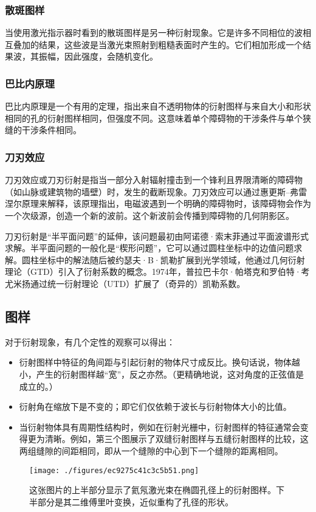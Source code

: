 \subsubsection{散斑图样}  
当使用激光指示器时看到的散斑图样是另一种衍射现象。它是许多不同相位的波相互叠加的结果，这些波是当激光束照射到粗糙表面时产生的。它们相加形成一个结果波，其振幅，因此强度，会随机变化。
\subsubsection{巴比内原理}   
巴比内原理是一个有用的定理，指出来自不透明物体的衍射图样与来自大小和形状相同的孔的衍射图样相同，但强度不同。这意味着单个障碍物的干涉条件与单个狭缝的干涉条件相同。
\subsubsection{刀刃效应} 
刀刃效应或刀刃衍射是指当一部分入射辐射撞击到一个锋利且界限清晰的障碍物（如山脉或建筑物的墙壁）时，发生的截断现象。刀刃效应可以通过惠更斯–弗雷涅尔原理来解释，该原理指出，电磁波遇到一个明确的障碍物时，该障碍物会作为一个次级源，创造一个新的波前。这个新波前会传播到障碍物的几何阴影区。

刀刃衍射是“半平面问题”的延伸，该问题最初由阿诺德·索末菲通过平面波谱形式求解。半平面问题的一般化是“楔形问题”，它可以通过圆柱坐标中的边值问题求解。圆柱坐标中的解法随后被约瑟夫·B·凯勒扩展到光学领域，他通过几何衍射理论（GTD）引入了衍射系数的概念。1974年，普拉巴卡尔·帕塔克和罗伯特·考尤米扬通过统一衍射理论（UTD）扩展了（奇异的）凯勒系数。
\subsection{图样}
对于衍射现象，有几个定性的观察可以得出：
\begin{itemize}
\item 衍射图样中特征的角间距与引起衍射的物体尺寸成反比。换句话说，物体越小，产生的衍射图样越“宽”，反之亦然。（更精确地说，这对角度的正弦值是成立的。）
\item 衍射角在缩放下是不变的；即它们仅依赖于波长与衍射物体大小的比值。
\item 当衍射物体具有周期性结构时，例如在衍射光栅中，衍射图样的特征通常会变得更为清晰。例如，第三个图展示了双缝衍射图样与五缝衍射图样的比较，这两组缝隙的间距相同，即从一个缝隙的中心到下一个缝隙的距离相同。
\end{itemize}
\begin{figure}[ht]
\centering
\texttt{[image: ./figures/ec9275c41c3c5b51.png]}
\caption{这张图片的上半部分显示了氦氖激光束在椭圆孔径上的衍射图样。下半部分是其二维傅里叶变换，近似重构了孔径的形状。} \label{fig_YS_23}
\end{figure}
